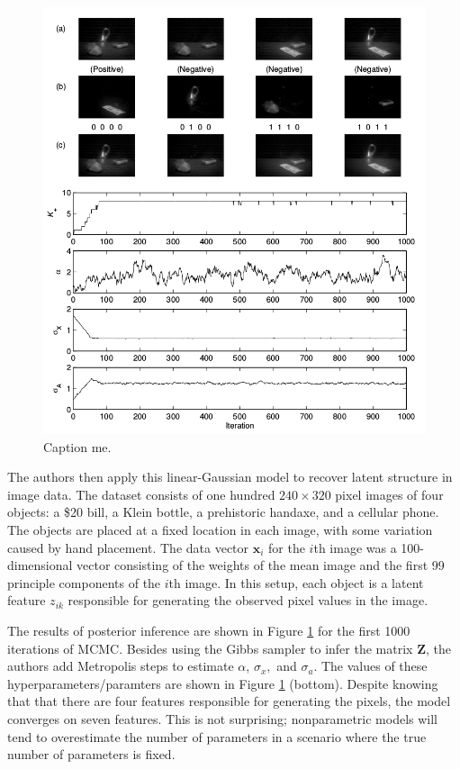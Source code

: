\documentclass[twoside]{article}
\begin{document}
\begin{figure}[h]
  \centering
    \includegraphics[scale=0.40]{exp}
    \caption{Caption me.\citet{Newman}}
  \label{fig:exp}
\end{figure}

The authors then apply this linear-Gaussian model to recover latent structure in image data. The dataset consists of one hundred $240 \times 320$ pixel images of four objects: a \$20 bill, a Klein bottle, a prehistoric handaxe, and a cellular phone. The objects are placed at a fixed location in each image, with some variation caused by hand placement. The data vector $\mathbf{x}_i$ for the $i$th image was a 100-dimensional vector consisting of the weights of the mean image and the first 99 principle components of the $i$th image. In this setup, each object is a latent feature $z_{ik}$ responsible for generating the observed pixel values in the image.

The results of posterior inference are shown in Figure \ref{fig:exp} for the first 1000 iterations of MCMC. Besides using the Gibbs sampler to infer the matrix $\mathbf{Z}$, the authors add Metropolis steps to estimate $\alpha$, $\sigma_x,$ and $\sigma_a$. The values of these hyperparameters/paramters are shown in Figure \ref{fig:exp} (bottom). Despite knowing that that there are four features responsible for generating the pixels, the model converges on seven features. This is not surprising; nonparametric models will tend to overestimate the number of parameters in a scenario where the true number of parameters is fixed.
\end{document}
